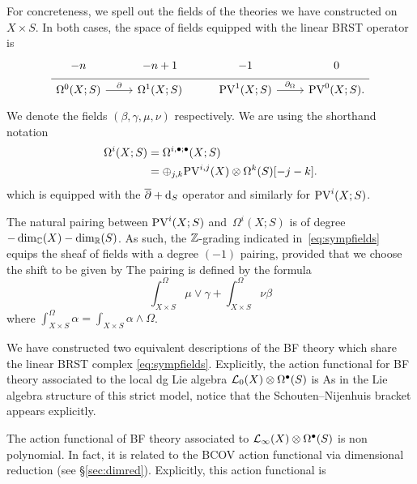 \parsec
For concreteness, we spell out the fields of the theories we have constructed on $X \times S$.
In both cases, the space of fields equipped with the linear BRST operator is
\begin{equation}
  \label{eq:sympfields} 
  \begin{tikzcd}[row sep = 1 ex]
    -n & -n + 1 & -1 & 0 \\ \hline
    \Omega^{0}(X;S) \ar[r, "\del"] & \Omega^{1}(X;S) & 
     \PV^{1}(X; S) \ar[r, "\div"] & \PV^{0}(X; S).
\end{tikzcd}
\end{equation}
We denote the fields $(\beta,\gamma,\mu,\nu)$ respectively.
We are using the shorthand notation
\begin{align*}
\Omega^{i}(X;S) & = \Omega^{i , \bullet;\bullet}(X;S) \\
 & = \oplus_{j,k} {\rm PV}^{i,j}(X) \otimes \Omega^k(S) [-j-k] .
\end{align*}
which is equipped with the $\overline{\partial} + {\rm d}_S$ operator and similarly for ${\rm PV}^{i}(X;S)$. 

The natural pairing between ${\rm PV}^i(X;S)$ and~$\Omega^i(X;S)$ is of degree $-\dim_{\mathbb{C}}(X) -\dim_{\mathbb{R}}(S)$. 
As such, the $\mathbb{Z}$-grading indicated in~\eqref{eq:sympfields} equips the sheaf of fields with a degree $(-1)$ pairing, provided that we choose the shift to be given by
The pairing is defined by the formula 
\[
\int^\Omega_{X \times S} \mu \vee \gamma + \int^\Omega_{X \times S} \nu \beta 
\]
where $\int^\Omega_{X \times S} \alpha = \int_{X \times S} \alpha \wedge \Omega$. 

We have constructed two equivalent descriptions of the BF theory which share the linear BRST complex \eqref{eq:sympfields}.
Explicitly, the action functional for BF theory associated to the local dg Lie algebra $\mathcal L_0(X) \otimes \Omega^{\bullet}(S)$ is
As in the Lie algebra structure of this strict model, notice that the Schouten--Nijenhuis bracket appears explicitly. 

The action functional of BF theory associated to $\mathcal L_\infty(X) \otimes \Omega^{\bullet}(S)$ is non polynomial. 
In fact, it is related to the BCOV action functional via dimensional reduction (see \S \ref{sec:dimred}).
Explicitly, this action functional is


